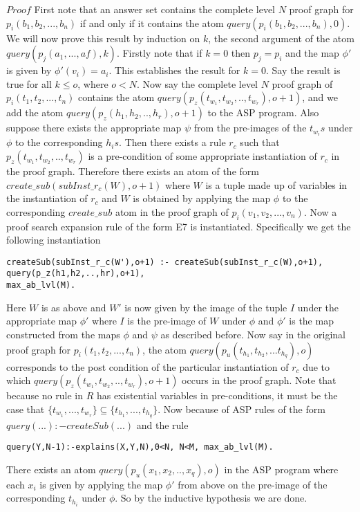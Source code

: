 \documentclass{article}
\begin{document}
$\textit{Proof}$ First note that an answer set contains the complete level $N$ proof graph for $p_{i}(b_{1},b_{2},...,b_{n})$ if and only if it contains the atom $query(p_{i}(b_{1},b_{2},...,b_{n}),0)$. We will now prove this result by induction on $k$, the second argument of the atom $query(p_{j}(a_{1},...,a{f}),k)$. Firstly note that if $k = 0$ then $p_{j} = p_{i}$ and the map $\phi'$ is given by $\phi'(v_{i}) = a_{i}$. This establishes the result for $k=0$.  Say the result is true for all $k\leq o$, where $o<N$. Now say the complete level $N$ proof graph of $p_{i}(t_{1},t_{2},...,t_{n})$ contains the atom $query(p_{z}(t_{w_{1}},t_{w_{2}},..,t_{w_{r}}),o+1)$, and we add the atom $query(p_{z}(h_{1},h_{2},..,h_{r}),o+1)$ to the ASP program. Also suppose there exists the appropriate map $\psi$ from the pre-images of the $t_{w_{i}}s$ under $\phi$ to the corresponding $h_{i}s$. Then there exists a rule $r_{c}$ such that $p_{z}(t_{w_{1}},t_{w_{2}},..,t_{w_{r}})$ is a pre-condition of some appropriate instantiation of $r_{c}$ in the proof graph. Therefore there exists an atom of the form $create\_sub(subInst\_r_{c}(W),o+1)$ where $W$ is a tuple made up of variables in the instantiation of $r_{c}$ and $W$ is obtained by applying the map $\phi$ to the corresponding $create\_sub$ atom in the proof graph of $p_{i}(v_{1},v_{2},...,v_{n})$. Now a proof search expansion rule of the form E7 is instantiated. Specifically we get the following instantiation \begin{verbatim}
createSub(subInst_r_c(W'),o+1) :- createSub(subInst_r_c(W),o+1), query(p_z(h1,h2,..,hr),o+1),
max_ab_lvl(M).
\end{verbatim}  
Here $W$ is as above and $W'$ is now given by the image of the tuple $I$ under the appropriate map $\phi'$ where $I$ is the pre-image of $W$ under $\phi$ and $\phi'$ is the map constructed from the maps $\phi$ and $\psi$ as described before. Now say in the original proof graph for $p_{i}(t_{1},t_{2},...,t_{n})$, the atom $query(p_{u}(t_{h_{1}},t_{h_{2}},...t_{h_{q}}),o)$ corresponds to the post condition of the particular instantiation of $r_{c}$ due to which $query(p_{z}(t_{w_{1}},t_{w_{2}},..,t_{w_{r}}),o+1)$ occurs in the proof graph. Note that because no rule in $R$ has existential variables in pre-conditions, it must be the case that $\{t_{w_{1}},...,t_{w_{r}}\}\subseteq\{t_{h_{1}},...,t_{h_{q}}\}$. Now because of ASP rules of the form $query(...):-createSub(...)$ and the rule \begin{verbatim}
query(Y,N-1):-explains(X,Y,N),0<N, N<M, max_ab_lvl(M).    \end{verbatim}
There exists an atom $query(p_{u}(x_{1},x_{2},..,x_{q}),o)$ in the ASP program where each $x_{i}$ is given by applying the map $\phi'$ from above on the pre-image of the corresponding $t_{h_{i}}$ under $\phi$. So by the inductive hypothesis we are done.\\
\end{document}
